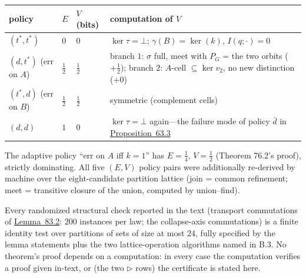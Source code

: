 {\def\LTcaptype{none} %
\begin{longtable}[]{@{}
  >{\raggedright\arraybackslash}p{}
  >{\raggedright\arraybackslash}p{}
  >{\raggedright\arraybackslash}p{}
  >{\raggedright\arraybackslash}p{}@{}}
\toprule\noalign{}
\begin{minipage}[b]{\linewidth}\raggedright
policy
\end{minipage} & \begin{minipage}[b]{\linewidth}\raggedright
\(E\)
\end{minipage} & \begin{minipage}[b]{\linewidth}\raggedright
\(V\) (bits)
\end{minipage} & \begin{minipage}[b]{\linewidth}\raggedright
computation of \(V\)
\end{minipage} \\
\midrule\noalign{}
\endhead
\bottomrule\noalign{}
\endlastfoot
\((t^*, t^*)\) & \(0\) & \(0\) & \(\ker \tau = \bot\); \(\gamma(B) = \ker(k)\), \(I(q; \cdot) = 0\) \\
\((d, t^*)\) (err on \(A\)) & \(\tfrac12\) & \(\tfrac12\) & branch \(1\): \(\sigma\) full, meet with \(P_G\) = the two orbits (\(+\tfrac12\)); branch \(2\): \(A\)-cell \(\subseteq \ker v_2\), no new distinction (\(+0\)) \\
\((t^*, d)\) (err on \(B\)) & \(\tfrac12\) & \(\tfrac12\) & symmetric (complement cells) \\
\((d, d)\) & \(1\) & \(0\) & \(\ker \tau = \bot\) again---\hspace{0pt}the failure mode of policy \(\bar d\) in \hyperlink{stmt:63.3}{Proposition~63.3} \\
\end{longtable}
}

The adaptive policy ``err on \(A\) iff \(k = 1\)'' has \(E = \tfrac14\), \(V = \tfrac12\) (Theorem 76.2's proof), strictly dominating. All five \((E, V)\) policy pairs were additionally re-derived by machine over the eight-candidate partition lattice (join = common refinement; meet = transitive closure of the union, computed by union--find).


Every randomized structural check reported in the text (transport commutations of \hyperlink{stmt:83.2}{Lemma~83.2}: \(200\) instances per law; the collapse-axis commutations) is a finite identity test over partitions of sets of size at most \(24\), fully specified by the lemma statements plus the two lattice-operation algorithms named in B.3. No theorem's proof depends on a computation: in every case the computation verifies a proof given in-text, or (the two \(\triangleright\) rows) the certificate is stated here.

